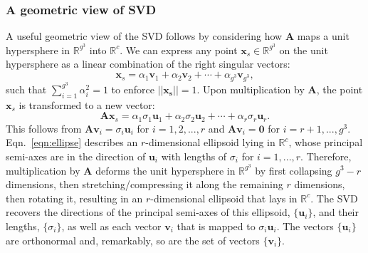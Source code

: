 \documentclass[journal=jacsat,manuscript=article,layout=traditional]{achemso}
\begin{document}
\subsubsection{A geometric view of SVD}
A useful geometric view of the SVD follows by considering how $\mathbf{A}$ maps a unit hypersphere in $\mathbb{R}^{g^3}$ into $\mathbb{R}^c$. We can express any point $\mathbf{x}_s\in \mathbb{R}^{g^3}$ on the unit hypersphere as a linear combination of the right singular vectors:
\begin{equation}
\mathbf{x}_s = \alpha_1 \mathbf{v}_1 + \alpha_2 \mathbf{v}_2 + \cdots + \alpha_{g^3} \mathbf{v}_{g^3},
\end{equation} such that $\sum_{i=1}^{g^3} \alpha_i^2 = 1$ to enforce $||\mathbf{x_s}||=1$. Upon multiplication by $\mathbf{A}$, the point $\mathbf{x}_s$ is transformed to a new vector:
\begin{equation}
\mathbf{A} \mathbf{x}_s = \alpha_1 \sigma_1 \mathbf{u}_1 + \alpha_2 \sigma_2 \mathbf{u}_2 + \cdots + \alpha_r \sigma_r \mathbf{u}_r.
\label{eqn:ellipse}
\end{equation} This follows from $\mathbf{A} \mathbf{v}_i = \sigma_i \mathbf{u}_i$ for $i=1,2,...,r$ and $\mathbf{A} \mathbf{v}_i = \mathbf{0}$ for $i=r+1,...,g^3$. Eqn.~\ref{eqn:ellipse} describes an $r$-dimensional ellipsoid lying in $\mathbb{R}^c$, whose principal semi-axes are in the direction of $\mathbf{u}_i$ with lengths of $\sigma_i$ for $i=1,...,r$. Therefore, multiplication by $\mathbf{A}$ deforms the unit hypersphere in $\mathbb{R}^{g^3}$ by first collapsing $g^3-r$ dimensions, then stretching/compressing it along the remaining $r$ dimensions, then rotating it, resulting in an $r$-dimensional ellipsoid that lays in $\mathbb{R}^c$. The SVD recovers the directions of the principal semi-axes of this ellipsoid, $\{\mathbf{u}_i\}$, and their lengths, $\{\sigma_i\}$, as well as each vector $\mathbf{v}_i$ that is mapped to $\sigma_i \mathbf{u}_i$. The vectors $\{\mathbf{u}_i\}$ are orthonormal and, remarkably, so are the set of vectors $\{\mathbf{v}_i\}$.


\end{document}
